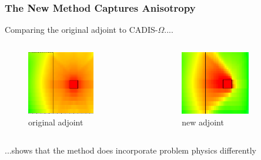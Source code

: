 \documentclass[xcolor=x11names,compress,handout]{beamer}
\renewcommand{\(}{\begin{columns}}
\renewcommand{\)}{\end{columns}}
\newcommand{\<}[1]{\begin{column}{#1}}
\renewcommand{\>}{\end{column}}
\begin{document}
\begin{frame}[fragile]
  \frametitle{The New Method Captures Anisotropy}
Comparing the original adjoint to CADIS-$\Omega$....
  \begin{columns}
    \begin{column}{0.5\textwidth}
  	\begin{figure}
  	\begin{center}
  		\includegraphics[height=1.1in,clip]{../figs/maze-adj-orig.png}
		\caption{original adjoint}
	\end{center}
  	\end{figure}
    \end{column}
  \pause
    \begin{column}{0.5\textwidth}
     	  \begin{figure}
  	\begin{center}
  		\includegraphics[height=1.1in,clip]{../figs/maze-adj-new}
		\caption{new adjoint}
	\end{center}
  	\end{figure}
  	\end{column}  
  \end{columns}
  ...shows that the method does incorporate problem physics differently
\end{frame}
\end{document}
